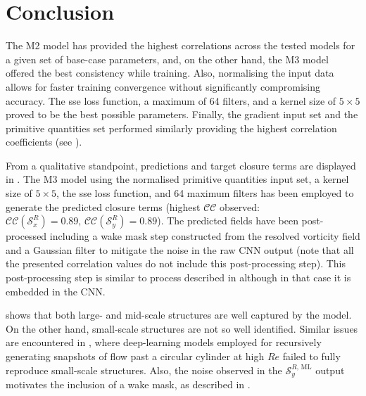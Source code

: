 \documentclass[../main.tex]{subfiles}
\begin{document}
\section{Conclusion}

The M2 model has provided the highest correlations across the tested models for a given set of base-case parameters, and, on the other hand, the M3 model offered the best consistency while training.
Also, normalising the input data allows for faster training convergence without significantly compromising accuracy.
The sse loss function, a maximum of 64 filters, and a kernel size of $5\times5$ proved to be the best possible parameters.
Finally, the gradient input set and the primitive quantities set performed similarly providing the highest correlation coefficients (see ).

From a qualitative standpoint, predictions and target closure terms are displayed in .
The M3 model using the normalised primitive quantities input set, a kernel size of $5\times5$, the sse loss function, and 64 maximum filters has been employed to generate the predicted closure terms (highest $\mathcal{CC}$ observed: $\mathcal{CC}(\mathcal{S}^R_x)=0.89,\, \mathcal{CC}(\mathcal{S}^R_y)=0.89$).
The predicted fields have been post-processed including a wake mask step constructed from the resolved vorticity field and a Gaussian filter to mitigate the noise in the raw CNN output (note that all the presented correlation values do not include this post-processing step).
This post-processing step is similar to process described in  although in that case it is embedded in the CNN.

 shows that both large- and mid-scale structures are well captured by the model.
On the other hand, small-scale structures are not so well identified.
Similar issues are encountered in \cite{Lee2019}, where deep-learning models employed for recursively generating snapshots of flow past a circular cylinder at high $Re$ failed to fully reproduce small-scale structures.
Also, the noise observed in the $\mathcal{S}^{R,\,\mathrm{ML}}_y$ output motivates the inclusion of a wake mask, as described in .
\end{document}
